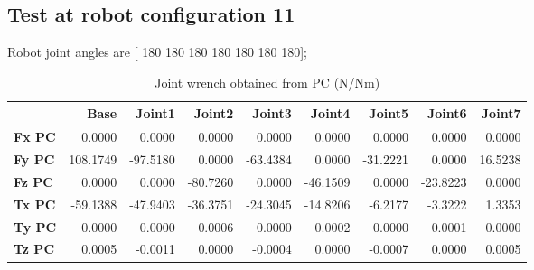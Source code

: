 
\subsection{Test at robot configuration 11}
Robot joint angles are  [ 180  180  180  180  180  180  180];

\begin{table}[h!]
	\centering
	\caption{Joint wrench obtained from PC (N/Nm)}
	\label{wrech_PC_Pose11}
	\begin{tabular}{|l|r|r|r|r|r|r|r|r|}
		\hline
		\textbf{}  & \textbf{Base} & \textbf{Joint1}  & \textbf{Joint2}  & \textbf{Joint3}  & \textbf{Joint4}  & \textbf{Joint5}  & \textbf{Joint6}  & \textbf{Joint7} \\ \hline
		\textbf{Fx PC}  & 0.0000        & 0.0000        & 0.0000        & 0.0000        & 0.0000        & 0.0000        & 0.0000        & 0.0000 \\ \hline
		\textbf{Fy PC}  & 108.1749        & -97.5180        & 0.0000        & -63.4384        & 0.0000        & -31.2221        & 0.0000        & 16.5238 \\ \hline
		\textbf{Fz PC}  & 0.0000        & 0.0000        & -80.7260        & 0.0000        & -46.1509        & 0.0000        & -23.8223        & 0.0000 \\ \hline
		\textbf{Tx PC}  & -59.1388        & -47.9403        & -36.3751        & -24.3045        & -14.8206        & -6.2177        & -3.3222        & 1.3353 \\ \hline
		\textbf{Ty PC}  & 0.0000        & 0.0000        & 0.0006        & 0.0000        & 0.0002        & 0.0000        & 0.0001        & 0.0000 \\ \hline
		\textbf{Tz PC}  & 0.0005        & -0.0011        & 0.0000        & -0.0004        & 0.0000        & -0.0007        & 0.0000        & 0.0005 \\ \hline
	\end{tabular}
\end{table}

